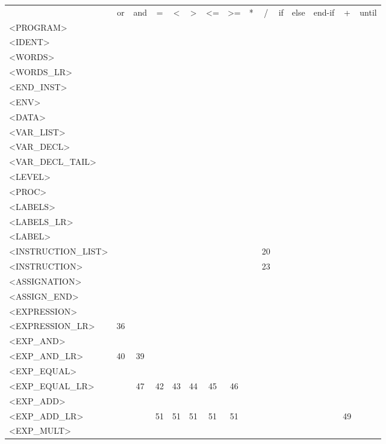 \documentclass[a4paper,11pt]{article}
\begin{document}
\newpage
\begin{longtable}{l||cccccccccccccc}
	& or & and & = & < & > & <= & >= & * & / & if & else & end-if & + & until\\
	<PROGRAM> & & & & & & & & & & & & & & \\
	<IDENT> & & & & & & & & & & & & & & \\
	<WORDS>  & & & & & & & & & & & & & & \\
	<WORDS\_LR>  & & & & & & & & & & & & & & \\
	<END\_INST> & & & & & & & & & & & & & & \\
	<ENV> & & & & & & & & & & & & & & \\
	<DATA>  & & & & & & & & & & & & & & \\
	<VAR\_LIST> & & & & & & & & & & & & & & \\
	<VAR\_DECL>  & & & & & & & & & & & & & & \\
	<VAR\_DECL\_TAIL> & & & & & & & & & & & & & & \\
	<LEVEL> & & & & & & & & & & & & & & \\
	<PROC> & & & & & & & & & & & & & & \\
	<LABELS> & & & & & & & & & & & & & & \\
	<LABELS\_LR>  & & & & & & & & & & & & & & \\
	<LABEL>  & & & & & & & & & & & & & & \\
	<INSTRUCTION\_LIST> & & & & & & & & & 20 & & & & & \\
	<INSTRUCTION> & & & & & & & & & 23 & & & & & \\
	<ASSIGNATION> & & & & & & & & & & & & & & \\
	<ASSIGN\_END> & & & & & & & & & & & & & & \\
	<EXPRESSION>  & & & & & & & & & & & & & & \\
	<EXPRESSION\_LR> & 36 & & & & & & & & & & & & & \\
	<EXP\_AND>  & & & & & & & & & & & & &  &\\
	<EXP\_AND\_LR> & 40 & 39 & & & & & & & & & & & & \\
	<EXP\_EQUAL>  & & & & & & & & & & & & & & \\
	<EXP\_EQUAL\_LR> & & 47 & 42 & 43 & 44 & 45 & 46 & & & & & & & \\
	<EXP\_ADD>  & & & & & & & & & & & & & \\
	<EXP\_ADD\_LR> & & & 51 & 51 & 51 & 51 & 51 & & & & & & 49 & \\
	<EXP\_MULT>  & & & & & & & & & & & & & & \\

\end{longtable}
\end{document}
